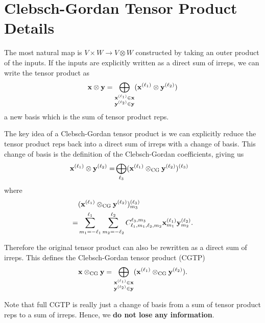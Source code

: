 \section{Clebsch-Gordan Tensor Product Details}
\label{sec:CGTP_details}
The most natural map is $V\times W\to V\otimes W$ constructed by taking an outer product of the inputs. If the inputs are explicitly written as a direct sum of irreps, we can write the tensor product as
\begin{align}
\label{eqn:tensor_product_full}
\mathbf{x} \otimes \mathbf{y} = \bigoplus_{\substack{\mathbf{x}^{(\ell_{1})} \in \mathbf{x} \\ \mathbf{y}^{(\ell_{2})} \in \mathbf{y}}}(\mathbf{x}^{(\ell_{1})} \otimes \mathbf{y}^{(\ell_{2})})
\end{align}
a new basis which is the sum of tensor product reps.

The key idea of a Clebsch-Gordan tensor product is we can explicitly reduce the tensor product reps back into a direct sum of irreps with a change of basis. This change of basis is the definition of the Clebsch-Gordan coefficients, giving us
\begin{align}
\label{eqn:cgtp_sum}
\mathbf{x}^{(\ell_{1})}\otimes\mathbf{y}^{(\ell_{2})} = & \bigoplus_{\ell_3} (\mathbf{x}^{(\ell_{1})} \otimes_{\mathrm{CG}} \mathbf{y}^{(\ell_{2})})^{(\ell_3)}
\end{align}
where
\begin{align}
\label{eqn:cgtp}
&(\mathbf{x}^{(\ell_{1})} \otimes_{\mathrm{CG}} \mathbf{y}^{(\ell_{2})})^{(\ell_3)}_{m_3} \nonumber \\
= &\sum_{m_1=-\ell_1}^{\ell_1}\sum_{m_2=-\ell_2}^{\ell_2} C^{\ell_3,m_3}_{\ell_1,m_1,\ell_2,m_2}\mathbf{x}^{(\ell_{1})}_{m_1}\mathbf{y}^{(\ell_{2})}_{m_2}.
\end{align}

Therefore the original tensor product can also be rewritten as a direct sum of irreps. This defines the Clebsch-Gordan tensor product (CGTP)
\begin{align}
\label{eqn:cgtp_full}
\mathbf{x} \otimes_{\mathrm{CG}} \mathbf{y} = \bigoplus_{\substack{\mathbf{x}^{(\ell_{1})} \in \mathbf{x} \\ \mathbf{y}^{(\ell_{2})} \in \mathbf{y}}}(\mathbf{x}^{(\ell_{1})} \otimes_{\mathrm{CG}} \mathbf{y}^{(\ell_{2})}).
\end{align}

Note that full CGTP is really just a change of basis from a sum of tensor product reps to a sum of irreps. Hence, we \textbf{do not lose any information}.

